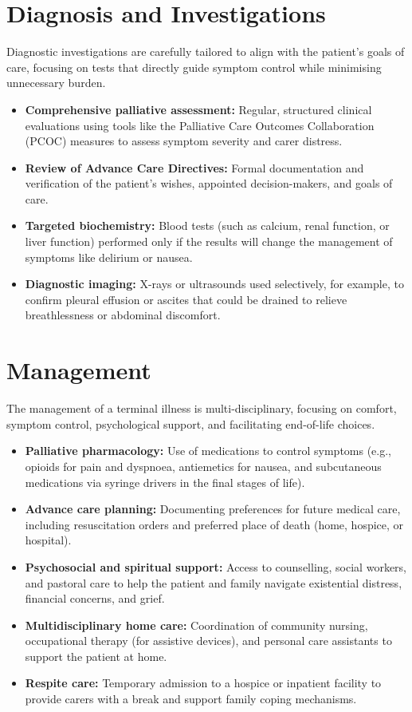\section*{Diagnosis and Investigations}
Diagnostic investigations are carefully tailored to align with the patient's goals of care, focusing on tests that directly guide symptom control while minimising unnecessary burden.
\begin{itemize}
    \item \textbf{Comprehensive palliative assessment:} Regular, structured clinical evaluations using tools like the Palliative Care Outcomes Collaboration (PCOC) measures to assess symptom severity and carer distress.
    \item \textbf{Review of Advance Care Directives:} Formal documentation and verification of the patient's wishes, appointed decision-makers, and goals of care.
    \item \textbf{Targeted biochemistry:} Blood tests (such as calcium, renal function, or liver function) performed only if the results will change the management of symptoms like delirium or nausea.
    \item \textbf{Diagnostic imaging:} X-rays or ultrasounds used selectively, for example, to confirm pleural effusion or ascites that could be drained to relieve breathlessness or abdominal discomfort.
\end{itemize}

\section*{Management}
The management of a terminal illness is multi-disciplinary, focusing on comfort, symptom control, psychological support, and facilitating end-of-life choices.
\begin{itemize}
    \item \textbf{Palliative pharmacology:} Use of medications to control symptoms (e.g., opioids for pain and dyspnoea, antiemetics for nausea, and subcutaneous medications via syringe drivers in the final stages of life).
    \item \textbf{Advance care planning:} Documenting preferences for future medical care, including resuscitation orders and preferred place of death (home, hospice, or hospital).
    \item \textbf{Psychosocial and spiritual support:} Access to counselling, social workers, and pastoral care to help the patient and family navigate existential distress, financial concerns, and grief.
    \item \textbf{Multidisciplinary home care:} Coordination of community nursing, occupational therapy (for assistive devices), and personal care assistants to support the patient at home.
    \item \textbf{Respite care:} Temporary admission to a hospice or inpatient facility to provide carers with a break and support family coping mechanisms.
\end{itemize}

